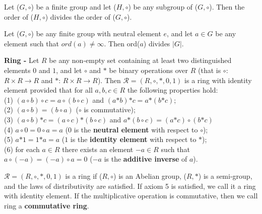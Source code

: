 \documentclass[a4paper]{article}
\begin{document}
\begin{theorem}
Let ($G, \circ$) be a finite group and let ($H, \circ$) be any subgroup of ($G, \circ$). Then the order of ($H, \circ$) divides the order of ($G, \circ$).
\end{theorem}


\begin{corollary}
Let ($G, \circ$) be any finite group with neutral element $e$, and let $a \in G$ be any element such that $ord(a) \neq \infty$. Then ord($a$) divides $|G|$.
\end{corollary}


\begin{definition}
\textbf{Ring -} Let $R$ be any non-empty set containing at least two distinguished elements $0$ and $1$, and let $\circ$ and $\mathcal{*}$ be binary operations over $R$ (that is $\circ$: $R \times R \to R$ and $\mathcal{*}$: $R \times R \to R$). Then $\mathcal{R} =(R, \circ, \mathcal{*}, 0, 1)$ is a ring with identity element provided that for all $a,b,c \in R$ the following properties hold:\\
(1) $(a \circ b) \circ c = a \circ (b \circ c)$ and $(a \mathcal{*} b) \mathcal{*} c = a \mathcal{*} (b \mathcal{*} c)$;\\
(2) $(a \circ b) = (b \circ a)$ ($\circ$ is commutative);\\
(3) $(a \circ b) \mathcal{*} c = (a \circ c) \mathcal{*} (b \circ c)$ and $a \mathcal{*} (b \circ c) = (a \mathcal{*} c) \circ (b \mathcal{*} c)$\\
(4) $a \circ 0 = 0 \circ a = a$ ($0$ is the \textbf{neutral element} with respect to $\circ$);\\
(5) $a \mathcal{*} 1 = 1 \mathcal{*} a = a$ ($1$ is the \textbf{identity element} with respect to $\mathcal{*}$);\\
(6) for each $a \in R$ there exists an element $-a \in R$ such that $a \circ (-a) = (-a) \circ a = 0$ ($-a$ is the \textbf{additive inverse} of $a$).
\end{definition}
$\mathcal{R} =(R, \circ, \mathcal{*}, 0, 1)$ is a ring if ($R, \circ$) is an Abelian group, ($R, \mathcal{*}$) is a semi-group, and the laws of distributivity are satisfied. If axiom 5 is satisfied, we call it a ring with identity element. If the multiplicative operation is commutative, then we call ring a \textbf{commutative ring}.
\end{document}
